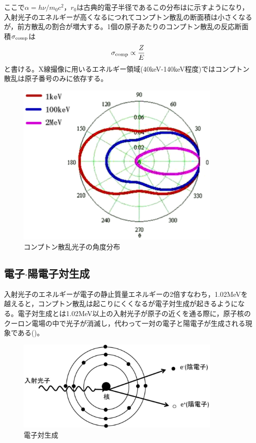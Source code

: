 ここで$\alpha=h\nu/m_0c^2，r_0$は古典的電子半径であるこの分布はに示すようになり，入射光子のエネルギーが高くなるにつれてコンプトン散乱の断面積は小さくなるが，前方散乱の割合が増大する。1個の原子あたりのコンプトン散乱の反応断面積$\sigma_{\rm comp}$は
\begin{align}
\sigma_{\rm comp}\propto\frac{Z}{E}\label{eq:sigma_comp}
\end{align}
と書ける。X線撮像に用いるエネルギー領域(40keV-140keV程度)ではコンプトン散乱は原子番号のみに依存する。

\begin{figure}[H]
 \begin{center}
 \includegraphics[width=10cm]{image/other/comp_cross.eps}
 \end{center}
 \caption{コンプトン散乱光子の角度分布\cite{nishidai}}
 \label{fig:comp_sigma}
\end{figure}

%
\subsection{電子$\cdot$陽電子対生成}
入射光子のエネルギーが電子の静止質量エネルギーの2倍すなわち，1.02MeVを越えると，コンプトン散乱は起こりにくくなるが電子対生成が起きるようになる。電子対生成とは1.02MeV以上の入射光子が原子の近くを通る際に，原子核のクーロン電場の中で光子が消滅し，代わって一対の電子と陽電子が生成される現象である()。

\begin{figure}[H]
 \begin{center}
 \includegraphics[width=10cm]{image/other/pair_create.eps}
 \end{center}
 \caption{電子対生成}
 \label{fig:pair}
\end{figure}


